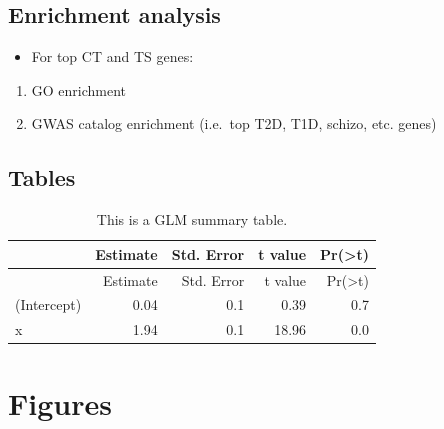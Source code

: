 \documentclass[]{article}
\begin{document}
\subsection{Enrichment analysis}\label{enrichment-analysis}

\begin{itemize}
\itemsep1pt\parskip0pt
\item
  For top CT and TS genes:
\end{itemize}

\begin{enumerate}
\def\labelenumi{\arabic{enumi}.}
\itemsep1pt\parskip0pt
\item
  GO enrichment
\item
  GWAS catalog enrichment (i.e.~top T2D, T1D, schizo, etc. genes)
\end{enumerate}

\subsection{Tables}\label{tables}

\begin{longtable}[c]{@{}lrrrr@{}}
\caption{This is a GLM summary table.}\tabularnewline
\toprule
& Estimate & Std. Error & t value &
Pr(\textgreater{}\textbar{}t\textbar{})\tabularnewline
\midrule
\endfirsthead
\toprule
& Estimate & Std. Error & t value &
Pr(\textgreater{}\textbar{}t\textbar{})\tabularnewline
\midrule
\endhead
(Intercept) & 0.04 & 0.1 & 0.39 & 0.7\tabularnewline
x & 1.94 & 0.1 & 18.96 & 0.0\tabularnewline
\bottomrule
\end{longtable}

\section{Figures}\label{figures}
\end{document}
